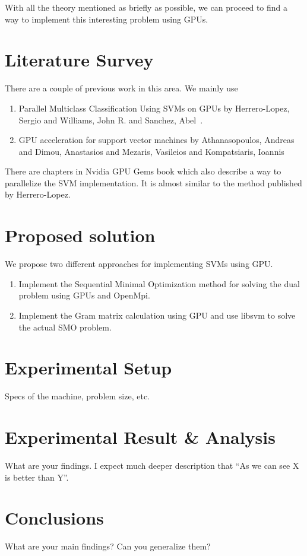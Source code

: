 \documentclass{article}
\begin{document}
With all the theory mentioned as briefly as possible, we can proceed to find a way to implement this interesting problem using GPUs.

\section{Literature Survey}
There are a couple of previous work in this area.  We mainly use
\begin{enumerate}
    \item Parallel Multiclass Classification Using SVMs on GPUs by Herrero-Lopez, Sergio and Williams, John R. and Sanchez, Abel~\cite{Herrero-Lopez:2010:PMC:1735688.1735692}.
    \item GPU acceleration for support vector machines by Athanasopoulos, Andreas and Dimou, Anastasios and Mezaris, Vasileios and Kompatsiaris, Ioannis~\cite{athanasopoulos2011gpu}
\end{enumerate}

There are chapters in Nvidia GPU Gems book which also describe a way to parallelize the SVM implementation.  It is almost similar to the method published by Herrero-Lopez.

\section{Proposed solution}
We propose two different approaches for implementing SVMs using GPU\@.

\begin{enumerate}
\item Implement the Sequential Minimal Optimization method for solving the dual problem using GPUs and OpenMpi.
\item Implement the Gram matrix calculation using GPU and use libsvm to solve the actual SMO problem.
\end{enumerate}

\section{Experimental Setup}
Specs of the machine, problem size, etc.
\section{Experimental Result \& Analysis}
What are your findings. I expect much deeper description that ``As we can see X is better than Y''.
\section{Conclusions}
What are your main findings? Can you generalize them?



\end{document}
